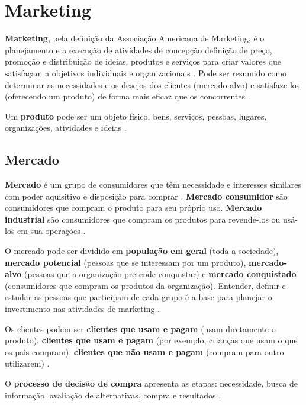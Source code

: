 \chapter{Marketing}

\textbf{Marketing}, pela definição da Associação Americana de Marketing, é o planejamento e a execução de atividades de concepção definição de preço, promoção e distribuição de ideias, produtos e serviços para criar valores que satisfaçam a objetivos individuais e organizacionais \cite{maximiano}. Pode ser resumido como determinar as necessidades e os desejos dos clientes (mercado-alvo) e satisfaze-los (oferecendo um produto) de forma mais eficaz que os concorrentes \cite{maximiano}.


Um \textbf{produto} pode ser  um objeto físico, bens, serviços, pessoas, lugares, organizações, atividades e ideias \cite{maximiano}.


\section{Mercado}

\textbf{Mercado} é um grupo de consumidores que têm necessidade e interesses similares com poder aquisitivo e disposição para comprar \cite{maximiano}. \textbf{Mercado consumidor}  são consumidores que compram o produto para seu próprio uso. \textbf{Mercado industrial} são consumidores que compram os produtos para revende-los ou usá-los em sua operações \cite{maximiano}.


O mercado pode ser dividido em \textbf{população em geral} (toda a sociedade), \textbf{mercado potencial} (pessoas que se interessam por um produto), \textbf{mercado-alvo} (pessoas que a organização pretende conquistar) e \textbf{mercado conquistado} (consumidores que compram os produtos da organização). Entender, definir e estudar as pessoas que participam de cada grupo é a base para planejar o investimento nas atividades de marketing \cite{maximiano}.


Os clientes podem ser \textbf{clientes que usam e pagam} (usam diretamente o produto), \textbf{clientes que usam e pagam} (por exemplo, crianças que usam o que os pais compram), \textbf{clientes que não usam e pagam} (compram para outro utilizarem) \cite{maximiano}.


O \textbf{processo de decisão de compra} apresenta as etapas: necessidade, busca de informação, avaliação de alternativas, compra e resultados \cite{maximiano}.


